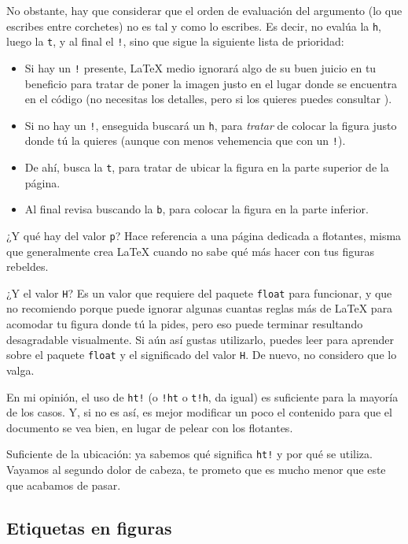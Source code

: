 No obstante, hay que considerar que el orden de evaluación del argumento (lo que escribes entre corchetes) no es tal y como lo escribes. Es decir, no evalúa la \texttt{h}, luego la \texttt{t}, y al final el \texttt{!}, sino que sigue la siguiente lista de prioridad:
\begin{itemize}
	\item Si hay un \texttt{!} presente, \LaTeX{} medio ignorará algo de su buen juicio en tu beneficio para tratar de poner la imagen justo en el lugar donde se encuentra en el código (no necesitas los detalles, pero si los quieres puedes consultar \cite{bib:figures_float}).
	\item Si no hay un \texttt{!}, enseguida buscará un \texttt{h}, para \emph{tratar} de colocar la figura justo donde tú la quieres (aunque con menos vehemencia que con un \texttt{!}).
	\item De ahí, busca la \texttt{t}, para tratar de ubicar la figura en la parte superior de la página.
	\item Al final revisa buscando la \texttt{b}, para colocar la figura en la parte inferior.
\end{itemize}

¿Y qué hay del valor \texttt{p}? Hace referencia a una página dedicada a flotantes, misma que generalmente crea \LaTeX{} cuando no sabe qué más hacer con tus figuras rebeldes.

¿Y el valor \texttt{H}? Es un valor que requiere del paquete \texttt{float} para funcionar, y que no recomiendo porque puede ignorar algunas cuantas reglas más de \LaTeX{} para acomodar tu figura donde tú la pides, pero eso puede terminar resultando desagradable visualmente. Si aún así gustas utilizarlo, puedes leer \cite{bib:float} para aprender sobre el paquete \texttt{float} y el significado del valor \texttt{H}. De nuevo, no considero que lo valga.

En mi opinión, el uso de \texttt{ht!} (o \texttt{!ht} o \texttt{t!h}, da igual) es suficiente para la mayoría de los casos. Y, si no es así, es mejor modificar un poco el contenido para que el documento se vea bien, en lugar de pelear con los flotantes.

Suficiente de la ubicación: ya sabemos qué significa \texttt{ht!} y por qué se utiliza. Vayamos al segundo dolor de cabeza, te prometo que es mucho menor que este que acabamos de pasar.



\subsection{Etiquetas en figuras}
\label{sub:etiquetas_en_figuras}



